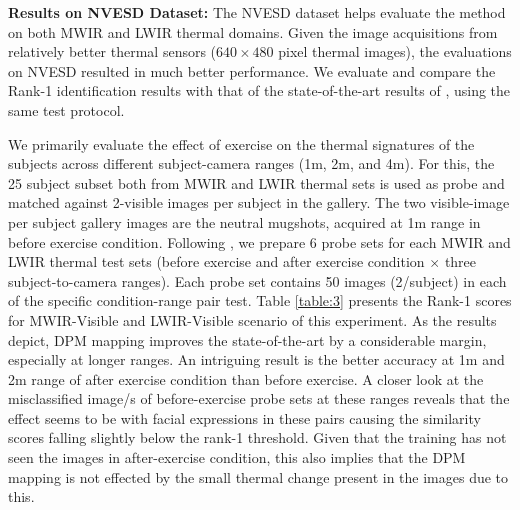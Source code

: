 \documentclass[smallextended,natbib]{svjour3}       \usepackage{graphicx}
\begin{document}
\noindent\textbf{Results on NVESD Dataset:} The NVESD dataset helps evaluate the method on both MWIR and LWIR thermal domains. Given the image acquisitions from relatively better thermal sensors ($640\times480$ pixel thermal images), the evaluations on NVESD resulted in much better performance. We evaluate and compare the Rank-1 identification results with that of the state-of-the-art results of \cite{hu2015}, using the same test protocol. 

We primarily evaluate the effect of exercise on the thermal signatures of the subjects across different subject-camera ranges (1m, 2m, and 4m). For this, the 25 subject subset both from MWIR and LWIR thermal sets is used as probe and matched against 2-visible images per subject in the gallery. The two visible-image per subject gallery images are the neutral mugshots, acquired at 1m range in before exercise condition. 
Following \cite{hu2015}, we prepare 6 probe sets for each MWIR and LWIR thermal test sets (before exercise and after exercise condition $\times$ three subject-to-camera ranges). Each probe set contains 50 images (2/subject) in each of the specific condition-range pair test. Table \ref{table:3} presents the Rank-1 scores for MWIR-Visible and LWIR-Visible scenario of this experiment. As the results depict, DPM mapping improves the state-of-the-art by a considerable margin, especially at longer ranges. An intriguing result is the better accuracy at 1m and 2m range of after exercise condition than before exercise. A closer look at the misclassified image/s of before-exercise probe sets at these ranges reveals that the effect seems to be with facial expressions in these pairs causing the similarity scores falling slightly below the rank-1 threshold. Given that the training has not seen the images in after-exercise condition, this also implies that the DPM mapping is not effected by the small thermal change present in the images due to this.
\end{document}
